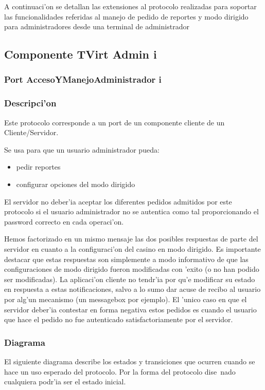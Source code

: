  A continuaci'on se detallan las extensiones al protocolo realizadas para soportar las funcionalidades referidas al manejo de pedido de reportes y modo dirigido para administradores desde una terminal de administrador 

\subsection{Componente TVirt Admin i} 
\subsubsection{Port AccesoYManejoAdministrador i}

\subsubsection{Descripci'on}

Este protocolo corresponde a un port de un componente cliente de un Cliente/Servidor.

Se usa para que un usuario administrador pueda:
\begin{itemize}
    \item{pedir reportes}
    \item{configurar opciones del modo dirigido}
\end{itemize}

El servidor no deber'ia aceptar los diferentes pedidos admitidos por este protocolo si el usuario administrador no se autentica como tal proporcionando el password correcto en cada operaci'on.

Hemos factorizado en un mismo mensaje las dos posibles respuestas de parte del servidor en cuanto a la configuraci'on del casino en modo dirigido. Es importante destacar que estas respuestas son simplemente a modo informativo de que las configuraciones de modo dirigido fueron modificadas con 'exito (o no han podido ser modificadas). La aplicaci'on cliente no tendr'ia por qu'e modificar su estado en respuesta a estas notificaciones, salvo a lo sumo dar acuse de recibo al usuario por alg'un mecanismo (un messagebox por ejemplo). El 'unico caso en que el servidor deber'ia contestar en forma negativa estos pedidos es cuando el usuario que hace el pedido no fue autenticado satisfactoriamente por el servidor.

\subsubsection{Diagrama}
El siguiente diagrama describe los estados y transiciones que ocurren cuando se hace un uso esperado del protocolo.
Por la forma del protocolo dise~nado cualquiera podr'ia ser el estado inicial.

